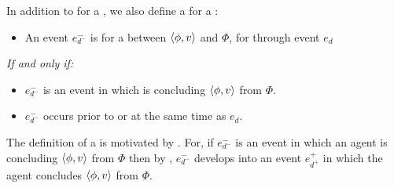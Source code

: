 \begin{note}
  In addition to \wit{} for a \ros{}, we also define a \pwit{} for a \ros{}:

  \begin{definition}
    \label{def:Pwit}%
    \vspace{-\baselineskip}
    \begin{itemize}
    \item
      An event \(e^{-}_{d^{-}}\) is \emph{} for a \ros{} between \(\langle \phi, v \rangle\) and \(\Phi\), for \vAgent{} through event \(e_{d}\)
    \end{itemize}

    \emph{If and only if:}

    \begin{itemize}
    \item
      \(e^{-}_{d^{-}}\) is an event in which \vAgent{} is concluding \(\langle \phi, v \rangle\) from \(\Phi\).
    \item
      \(e^{-}_{d^{-}}\) occurs prior to or at the same time as \(e_{d}\).
    \end{itemize}
    \vspace{-\baselineskip}
  \end{definition}

  \noindent%
  The definition of a \pwit{} is motivated by \assuPP{}.
  For, if \(e^{-}_{d^{-}}\) is an event in which an agent is concluding \(\langle \phi, v \rangle\) from \(\Phi\) then by \assuPP{}, \(e^{-}_{d^{-}}\) develops into an event \(e^{+}_{d^{+}}\) in which the agent concludes \(\langle \phi, v \rangle\) from \(\Phi\).
\end{note}



\section{\supportII{}}
\label{cha:ros:II}


